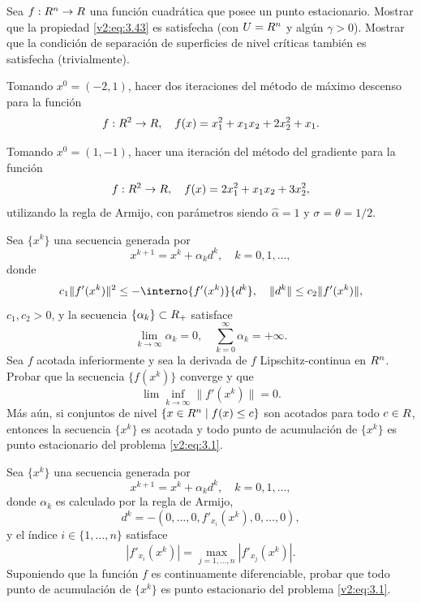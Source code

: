 \begin{exercise}\label{v2:ejer:3.1.11}
    Sea $f : R^n \to R$ una función cuadrática que posee un punto estacionario. Mostrar que la propiedad \eqref{v2:eq:3.43} es satisfecha (con $U = R^n$ y algún $\gamma > 0$). Mostrar que la condición de separación de superficies de nivel críticas también es satisfecha (trivialmente).
\end{exercise}

\begin{exercise}\label{v2:ejer:3.1.12}
    Tomando $x^0 = (-2, 1)$, hacer dos iteraciones del método de máximo descenso para la función
    \[
        f : R^2 \to R, \quad f(x) = x_1^2 + x_1 x_2 + 2x_2^2 + x_1.
    \]
\end{exercise}

\begin{exercise}\label{v2:ejer:3.1.13}
    Tomando $x^0 = (1, -1)$, hacer una iteración del método del gradiente para la función
    \[
        f : R^2 \to R, \quad f(x) = 2x_1^2 + x_1 x_2 + 3x_2^2,
    \]
    utilizando la regla de Armijo, con parámetros siendo $\hat{\alpha} = 1$ y $\sigma = \theta = 1/2$.
\end{exercise}

\begin{exercise}\label{v2:ejer:3.1.14}
    Sea $\{x^k\}$ una secuencia generada por
    \[
        x^{k+1} = x^k + \alpha_k d^k, \quad k = 0, 1, \dots,
    \]
    donde
    \[
        c_1 \|f'(x^k)\|^2 \le -\interno{f'(x^k)}{d^k}, \quad \|d^k\| \le c_2 \|f'(x^k)\|,
    \]
    $c_1, c_2 > 0$, y la secuencia $\{\alpha_k\} \subset R_+$ satisface
    \[
        \lim_{k \to \infty} \alpha_k = 0, \quad \sum_{k=0}^\infty \alpha_k = +\infty.
    \]
    Sea $f$ acotada inferiormente y sea la derivada de $f$ Lipschitz-continua en $R^n$. Probar que la secuencia $\{f(x^k)\}$ converge y que
    \[
        \lim \inf_{k \to \infty} \|f'(x^k)\| = 0.
    \]
    Más aún, si conjuntos de nivel $\{x \in R^n \mid f(x) \le c\}$ son acotados para todo $c \in R$, entonces la secuencia $\{x^k\}$ es acotada y todo punto de acumulación de $\{x^k\}$ es punto estacionario del problema \eqref{v2:eq:3.1}.
\end{exercise}

\begin{exercise}\label{v2:ejer:3.1.15}
    Sea $\{x^k\}$ una secuencia generada por
    \[
        x^{k+1} = x^k + \alpha_k d^k, \quad k = 0, 1, \dots,
    \]
    donde $\alpha_k$ es calculado por la regla de Armijo,
    \[
        d^k = -(0, \dots, 0, f'_{x_i}(x^k), 0, \dots, 0),
    \]
    y el índice $i \in \{1, \dots, n\}$ satisface
    \[
        |f'_{x_i}(x^k)| = \max_{j=1, \dots, n} |f'_{x_j}(x^k)|.
    \]
    Suponiendo que la función $f$ es continuamente diferenciable, probar que todo punto de acumulación de $\{x^k\}$ es punto estacionario del problema \eqref{v2:eq:3.1}.
\end{exercise}

